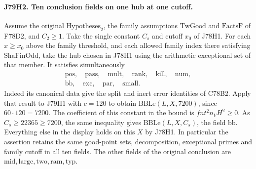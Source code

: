 \paragraph{J79H2. Ten conclusion fields on one hub at one cutoff.}
Assume the original $\mathrm{Hypotheses}_2$, the family assumptions
$\mathrm{TwGood}$ and $\mathrm{FactsF}$ of F78D2, and $C_2\ge1$.
Take the single constant $C_s$ and cutoff $x_0$ of J78H1. For each
$x\ge x_0$ above the family threshold, and each allowed family
index there satisfying $\mathrm{ShaFinOdd}$, take the hub chosen
in J78H1 using the arithmetic exceptional set of that member.
It satisfies simultaneously
\[
 \begin{gathered}
 \mathrm{pos},\quad\mathrm{pass},\quad\mathrm{mult},\quad
 \mathrm{rank},\quad\mathrm{kill},\quad\mathrm{num},\\
 \mathrm{bb},\quad\mathrm{exc},\quad\mathrm{par},\quad\mathrm{small}.
 \end{gathered}
\]
Indeed its canonical data give the split and inert error identities
of C78B2. Apply that result to J79H1 with $c=120$ to obtain
$\mathrm{BBLe}(L,X,7200)$, since $60\cdot120=7200$.
The coefficient of this constant in the bound is
$fnt^2 n_V H^2\ge0$. As $C_s\ge22365\ge7200$, the same
inequality gives $\mathrm{BBLe}(L,X,C_s)$, the field
$\mathrm{bb}$. Everything else in the display holds on this $X$
by J78H1. In particular the assertion retains the same good-point
sets, decomposition, exceptional primes and family cutoff in all ten
fields. The other fields of the original conclusion are
$\mathrm{mid},\mathrm{large},\mathrm{two},\mathrm{ram},\mathrm{typ}$.
